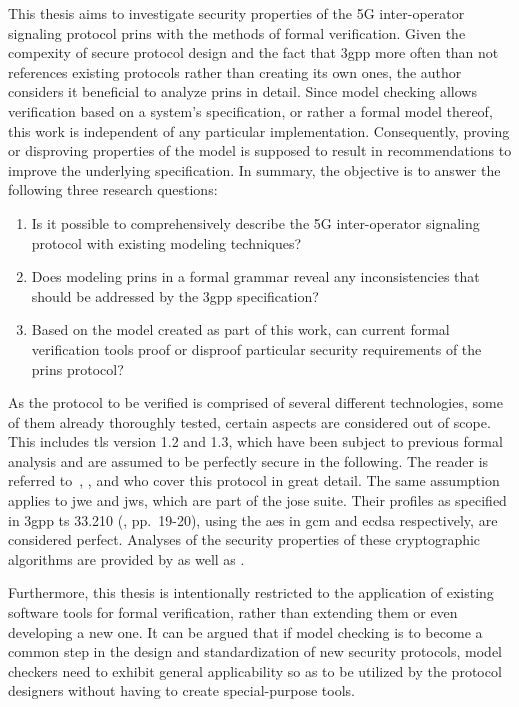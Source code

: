 This thesis aims to investigate security properties of the 5G inter-operator signaling protocol \gls{prins} with the methods of formal verification.
Given the compexity of secure protocol design and the fact that \gls{3gpp} more often than not references existing protocols rather than creating its own ones, the author considers it beneficial to analyze \gls{prins} in detail.
Since model checking allows verification based on a system's specification, or rather a formal model thereof, this work is independent of any particular implementation.
Consequently, proving or disproving properties of the model is supposed to result in recommendations to improve the underlying specification.
In summary, the objective is to answer the following three research questions:

\begin{enumerate}[label=(\arabic*)]
    \item Is it possible to comprehensively describe the 5G inter-operator signaling protocol with existing modeling techniques?

    \item Does modeling \gls{prins} in a formal grammar reveal any inconsistencies that should be addressed by the \gls{3gpp} specification?

    \item Based on the model created as part of this work, can current formal verification tools proof or disproof particular security requirements of the \gls{prins} protocol?
\end{enumerate}

As the protocol to be verified is comprised of several different technologies, some of them already thoroughly tested, certain aspects are considered out of scope.
This includes \gls{tls} version 1.2 and 1.3, which have been subject to previous formal analysis and are assumed to be perfectly secure in the following.
The reader is referred to~\cite{horvat2015formal}, \cite{cremers2017comprehensive}, and \cite{van2018analysis} who cover this protocol in great detail.
The same assumption applies to \gls{jwe} and \gls{jws}, which are part of the \gls{jose} suite.
Their profiles as specified in \gls{3gpp} \gls{ts} 33.210 (\cite{3gpp.33.210}, pp.~19-20), using the \gls{aes} in \gls{gcm} and \gls{ecdsa} respectively, are considered perfect.
Analyses of the security properties of these cryptographic algorithms are provided by \cite{mcgrew2004security} as well as \cite{fersch2016provable}.

Furthermore, this thesis is intentionally restricted to the application of existing software tools for formal verification, rather than extending them or even developing a new one.
It can be argued that if model checking is to become a common step in the design and standardization of new security protocols, model checkers need to exhibit general applicability so as to be utilized by the protocol designers without having to create special-purpose tools.

